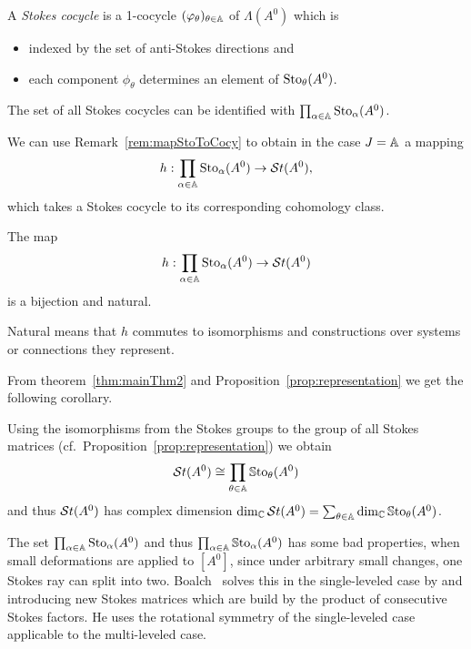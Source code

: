 \begin{comment}
  \cite[Thm.6.3.1]{sibuya1990Linear} says: if two differential equations have
  the same stokes phenomenon, they are analytically equivalent.
\end{comment}
\begin{defn}\label{defn:stokesCocycle}
  A \emph{Stokes cocycle} is a 1-cocycle $(\varphi_\theta)_{\theta\in\mathbb{A}}$ of
  $\Lambda(A^0)$ which is
  \begin{itemize}
    \item indexed by the set of anti-Stokes directions and
    \item each component $\phi_\theta$ determines an element of
      $\operatorname{Sto}_\theta(A^0)$.
  \end{itemize}
  \begin{s-rem}
    The set of all Stokes cocycles can be identified with
    $\prod_{\alpha\in\mathbb{A}}\operatorname{Sto}_\alpha(A^0)$.
  \end{s-rem}
\end{defn}
We can use Remark~\ref{rem:mapStoToCocy} to obtain in the case $J=\mathbb{A}$ a
mapping
\[
  h:\prod_{\alpha\in\mathbb{A}}\operatorname{Sto}_\alpha(A^0)\to\mathcal{S}{}t(A^0),
\]
which takes a Stokes cocycle to its corresponding cohomology class.
\begin{tthm}
  \label{thm:mainThm2}
  The map
  \[
    h:\prod_{\alpha\in\mathbb{A}}\operatorname{Sto}_\alpha(A^0)\to\mathcal{S}{}t(A^0)
  \]
  is a bijection and natural.
  \begin{s-rem}
    Natural means that $h$ commutes to isomorphisms and constructions over
    systems or connections they represent.
  \end{s-rem}
\end{tthm}
From theorem~\ref{thm:mainThm2} and Proposition~\ref{prop:representation} we
get the following corollary.
\begin{cor}
  Using the isomorphisms from the Stokes groups to the group of all Stokes
  matrices (cf.\ Proposition~\ref{prop:representation}) we obtain
  \[
    \mathcal{S}{}t(A^0) \cong \prod_{\theta\in\mathbb{A}}\operatorname{\mathbb{S}to}_\theta(A^0)
  \]
  and thus $\mathcal{S}{}t(A^0)$ has complex dimension
  $\dim_\mathbb{C}\mathcal{S}{}t(A^0)=\sum_{\theta\in\mathbb{A}}\dim_\mathbb{C}\operatorname{\mathbb{S}to}_\theta(A^0)$.
\end{cor}
\begin{rem}
  The set $\prod_{\alpha\in\mathbb{A}}\operatorname{Sto}_\alpha(A^0)$ and thus
  $\prod_{\alpha\in\mathbb{A}}\operatorname{\mathbb{S}to}_\alpha(A^0)$ has some bad properties, when small
  deformations are applied to $[A^0]$, since under arbitrary small changes, one
  Stokes ray can split into two. Boalch~\cite{boalch,thboalch} solves this in
  the single-leveled case by  and introducing new Stokes matrices which are build by the product
  of consecutive Stokes factors. He uses the rotational symmetry of the
  single-leveled case  applicable to the
  multi-leveled case.
\end{rem}

